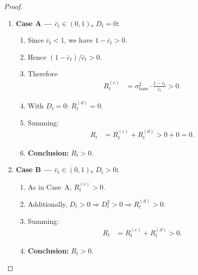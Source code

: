 \documentclass[12pt,openany]{book}
\numberwithin{equation}{chapter}
\theoremstyle{plain}
\theoremstyle{definition}
\theoremstyle{remark}
\begin{document}
\begin{proof}
\begin{enumerate}
  \item \textbf{Case A --- $\bar{c}_t \in (0,1)$,
        $D_t = 0$:}
        \begin{enumerate}
          \item Since $\bar{c}_t < 1$, we have
                $1 - \bar{c}_t > 0$.
          \item Hence $(1-\bar{c}_t)/\bar{c}_t > 0$.
          \item Therefore
                \begin{align}
                  R_t^{(c)}
                  &= \sigma_{\mathrm{base}}^2
                     \cdot
                     \frac{1-\bar{c}_t}{\bar{c}_t}
                   > 0.
                  \label{eq:case-A-Rc}
                \end{align}
          \item With $D_t = 0$: $R_t^{(d)} = 0$.
          \item Summing:
                \begin{align}
                  R_t
                  &= R_t^{(c)} + R_t^{(d)}
                   > 0 + 0 = 0.
                  \label{eq:case-A-Rt}
                \end{align}
          \item \textbf{Conclusion:} $R_t > 0$. \checkmark
        \end{enumerate}

  \item \textbf{Case B --- $\bar{c}_t \in (0,1)$,
        $D_t > 0$:}
        \begin{enumerate}
          \item As in Case~A, $R_t^{(c)} > 0$.
          \item Additionally, $D_t > 0 \Rightarrow
                D_t^2 > 0 \Rightarrow R_t^{(d)} > 0$.
          \item Summing:
                \begin{align}
                  R_t
                  &= R_t^{(c)} + R_t^{(d)}
                   > 0.
                  \label{eq:case-B-Rt}
                \end{align}
          \item \textbf{Conclusion:} $R_t > 0$. \checkmark
        \end{enumerate}


\end{enumerate}
\end{proof}
\end{document}
